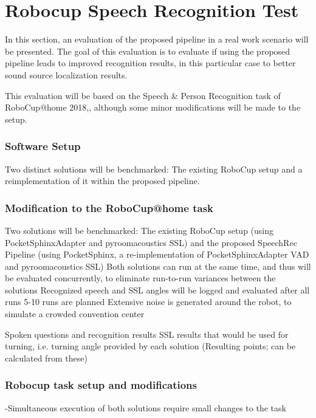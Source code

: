 
\section{Robocup Speech Recognition Test}
In this section, an evaluation of the proposed pipeline in a real work scenario will be presented.
The goal of this evaluation is to evaluate if using the proposed pipeline leads to improved recognition results, in this particular case to better sound source localization results.

This evaluation will be based on the Speech \& Person Recognition task of RoboCup@home 2018,\cite{speechrec_2018}, although some minor modifications will be made to the setup.

\subsubsection{Software Setup}
Two distinct solutions will be benchmarked:
The existing RoboCup setup and a reimplementation of it within the proposed pipeline.


\subsubsection{Modification to the RoboCup@home task}



Two solutions will be benchmarked: The existing RoboCup setup (using PocketSphinxAdapter and pyroomacoustics SSL) and the proposed SpeechRec Pipeline  (using PocketSphinx, a re-implementation of PocketSphinxAdapter VAD and pyroomacoustics SSL)
Both solutions can run at the same time, and thus will be evaluated concurrently, to eliminate run-to-run variances between the solutions
Recognized speech and SSL angles will be logged and evaluated after all runs
5-10 runs are planned
Extensive noise is generated around the robot, to simulate a crowded convention center

Spoken questions and recognition results
SSL results that would be used for turning, i.e. turning angle provided by each solution
(Resulting points; can be calculated from these)


\subsubsection{Robocup task setup and modifications}
-Simultaneous execution of both solutions require small changes to the task

